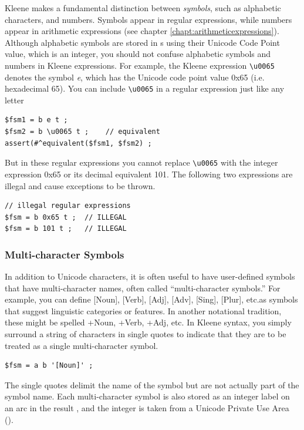 Kleene makes a fundamental distinction between \emph{symbols}, such as
alphabetic characters, and numbers.  Symbols appear in regular
expressions, while numbers appear in arithmetic expressions (see chapter
\ref{chapt:arithmeticexpressions}).  Although alphabetic symbols are
stored in \fsm{}s using their Unicode Code Point value, which is an
integer, you should not confuse alphabetic symbols and numbers in Kleene
expressions.  For example, the Kleene expression \verb!\u0065! denotes
the symbol \emph{e}, which has the Unicode code point value 0x65 (i.e.\@
hexadecimal 65).  You can include \verb!\u0065! in a regular expression
just like any letter


\begin{Verbatim}
$fsm1 = b e t ;
$fsm2 = b \u0065 t ;	// equivalent
assert(#^equivalent($fsm1, $fsm2) ;
\end{Verbatim}

\noindent
But in these regular expressions you cannot replace \verb!\u0065! with 
the integer expression 0x65 or its decimal equivalent 101.  The
following two expressions are illegal and cause exceptions to be thrown.


\begin{Verbatim}
// illegal regular expressions
$fsm = b 0x65 t ;  // ILLEGAL
$fsm = b 101 t ;   // ILLEGAL
\end{Verbatim}

\subsubsection{Multi-character Symbols}

In addition to Unicode characters, it is often useful to have user-defined symbols that
have multi-character names, often called ``multi-character symbols.''  For example, you can
define [Noun], [Verb], [Adj], [Adv], [Sing], [Plur], etc.\@ as symbols that suggest
linguistic categories or features.  In another notational tradition, these might be spelled +Noun,
+Verb, +Adj, etc.  In Kleene syntax, you simply surround a string of characters in single quotes
to indicate that they are to be treated as a single multi-character symbol.


\begin{Verbatim}
$fsm = a b '[Noun]' ;
\end{Verbatim}

\noindent
The single quotes delimit the name of the symbol but are not actually part of the symbol
name.  Each multi-character symbol is also stored as an integer label on an arc in the result
\fsm{}, and the integer is taken from a Unicode Private Use Area ().

